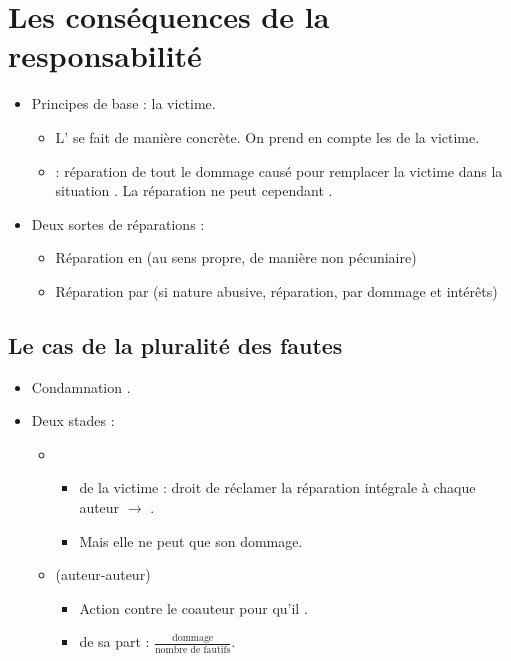 \section{Les conséquences de la responsabilité}
\begin{itemize}
	\item Principes de base :  la victime.
	\begin{itemize}
		\item L' se fait de manière concrète. On prend en compte les  de la victime.
		\item {} : réparation de tout le dommage causé pour remplacer la victime dans la situation . La réparation ne peut cependant .
	\end{itemize}
	\item Deux sortes de réparations :
	\begin{itemize}
		\item Réparation en  (au sens propre, de manière non pécuniaire)
		\item Réparation par  (si nature abusive, réparation, par dommage et intérêts)
	\end{itemize}
\end{itemize}

\subsection{Le cas de la pluralité des fautes}
\begin{itemize}
	\item Condamnation .
	\item Deux stades :
	\begin{itemize}
		\item {}
		\begin{itemize}
			\item {} de la victime : droit de réclamer la réparation intégrale à chaque auteur $\rightarrow$ .
			\item Mais elle ne peut  que son dommage.
		\end{itemize}
		\item {} (auteur-auteur)
		\begin{itemize}
			\item Action contre le coauteur pour qu'il .
			\item {} de sa part : $\frac{\textrm{dommage}}{\textrm{nombre de fautifs}}$.
		\end{itemize}
	\end{itemize}
\end{itemize}

